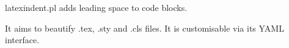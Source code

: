 \begin{one}
	latexindent.pl adds leading
	space to code blocks.
	\begin{two}
		It aims to beautify .tex, .sty
		and .cls files. It is customisable
		via its YAML interface.
	\end{two}
\end{one}
